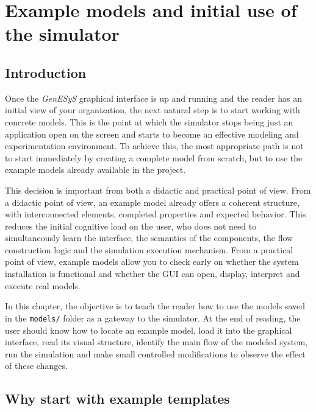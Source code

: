 \chapter{Example models and initial use of the simulator}
\label{chap:modelos_de_exemplo_e_uso_inicial}

\section{Introduction}
\label{sec:cap4_introducao}

Once the \textit{GenESyS} graphical interface is up and running and the reader has an initial view of your organization, the next natural step is to start working with concrete models. This is the point at which the simulator stops being just an application open on the screen and starts to become an effective modeling and experimentation environment. To achieve this, the most appropriate path is not to start immediately by creating a complete model from scratch, but to use the example models already available in the project.

This decision is important from both a didactic and practical point of view. From a didactic point of view, an example model already offers a coherent structure, with interconnected elements, completed properties and expected behavior. This reduces the initial cognitive load on the user, who does not need to simultaneously learn the interface, the semantics of the components, the flow construction logic and the simulation execution mechanism. From a practical point of view, example models allow you to check early on whether the system installation is functional and whether the GUI can open, display, interpret and execute real models.

In this chapter, the objective is to teach the reader how to use the models saved in the \texttt{models/} folder as a gateway to the simulator. At the end of reading, the user should know how to locate an example model, load it into the graphical interface, read its visual structure, identify the main flow of the modeled system, run the simulation and make small controlled modifications to observe the effect of these changes.

\section{Why start with example templates}
\label{sec:cap4_por_que_comecar_por_modelos_exemplo}

